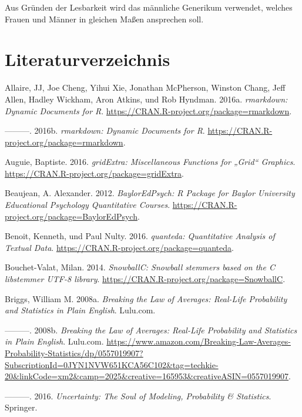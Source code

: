 \documentclass[12pt,ngerman,]{book}
\theoremstyle{definition}
\theoremstyle{definition}
\theoremstyle{remark}
\begin{document}
Aus Gründen der Lesbarkeit wird das männliche Generikum verwendet,
welches Frauen und Männer in gleichen Maßen ansprechen soll.

\chapter{Literaturverzeichnis}\label{literaturverzeichnis}

\hypertarget{refs}{}
\hypertarget{ref-rmarkdown}{}
Allaire, JJ, Joe Cheng, Yihui Xie, Jonathan McPherson, Winston Chang,
Jeff Allen, Hadley Wickham, Aron Atkins, und Rob Hyndman. 2016a.
\emph{rmarkdown: Dynamic Documents for R}.
\url{https://CRAN.R-project.org/package=rmarkdown}.

\hypertarget{ref-R-rmarkdown}{}
---------. 2016b. \emph{rmarkdown: Dynamic Documents for R}.
\url{https://CRAN.R-project.org/package=rmarkdown}.

\hypertarget{ref-R-gridExtra}{}
Auguie, Baptiste. 2016. \emph{gridExtra: Miscellaneous Functions for
„Grid`` Graphics}. \url{https://CRAN.R-project.org/package=gridExtra}.

\hypertarget{ref-R-BaylorEdPsych}{}
Beaujean, A. Alexander. 2012. \emph{BaylorEdPsych: R Package for Baylor
University Educational Psychology Quantitative Courses}.
\url{https://CRAN.R-project.org/package=BaylorEdPsych}.

\hypertarget{ref-R-quanteda}{}
Benoit, Kenneth, und Paul Nulty. 2016. \emph{quanteda: Quantitative
Analysis of Textual Data}.
\url{https://CRAN.R-project.org/package=quanteda}.

\hypertarget{ref-R-SnowballC}{}
Bouchet-Valat, Milan. 2014. \emph{SnowballC: Snowball stemmers based on
the C libstemmer UTF-8 library}.
\url{https://CRAN.R-project.org/package=SnowballC}.

\hypertarget{ref-breaking}{}
Briggs, William M. 2008a. \emph{Breaking the Law of Averages: Real-Life
Probability and Statistics in Plain English}. Lulu.com.

\hypertarget{ref-Breaking}{}
---------. 2008b. \emph{Breaking the Law of Averages: Real-Life
Probability and Statistics in Plain English}. Lulu.com.
\url{https://www.amazon.com/Breaking-Law-Averages-Probability-Statistics/dp/0557019907?SubscriptionId=0JYN1NVW651KCA56C102\&tag=techkie-20\&linkCode=xm2\&camp=2025\&creative=165953\&creativeASIN=0557019907}.

\hypertarget{ref-uncertainty}{}
---------. 2016. \emph{Uncertainty: The Soul of Modeling, Probability \&
Statistics}. Springer.
\end{document}
